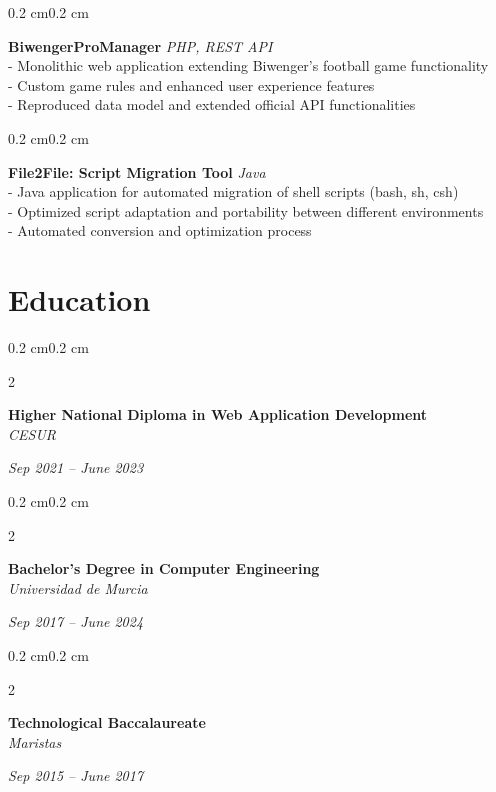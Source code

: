 \documentclass[10pt, letterpaper]{article}
\newenvironment{onecolentry}{
    \begin{adjustwidth}{0.2 cm}{0.2 cm}
}{
    \end{adjustwidth}
}
\newenvironment{twocolentry}[2][]{
    \onecolentry
    \def\secondColumn{#2}
    \setcolumnwidth{\fill, 4.5 cm}
    \begin{paracol}{2}
}{
    \switchcolumn \raggedleft \secondColumn
    \end{paracol}
    \endonecolentry
}
\begin{document}
    \vspace{0.1 cm}
    
    \begin{onecolentry}
        \textbf{BiwengerProManager} \hfill \textit{PHP, REST API} \\
        - Monolithic web application extending Biwenger's football game functionality \\
        - Custom game rules and enhanced user experience features \\
        - Reproduced data model and extended official API functionalities
    \end{onecolentry}

    \vspace{0.1 cm}
    
    \begin{onecolentry}
        \textbf{File2File: Script Migration Tool} \hfill \textit{Java} \\
        - Java application for automated migration of shell scripts (bash, sh, csh) \\
        - Optimized script adaptation and portability between different environments \\
        - Automated conversion and optimization process
    \end{onecolentry}

    \section{Education}
    \begin{twocolentry}{\textit{Sep 2021 -- June 2023}}
        \textbf{Higher National Diploma in Web Application Development} \\
        \textit{CESUR}
    \end{twocolentry}
    
    \begin{twocolentry}{\textit{Sep 2017 -- June 2024}}
        \textbf{Bachelor's Degree in Computer Engineering} \\
        \textit{Universidad de Murcia}
    \end{twocolentry}
    
    \begin{twocolentry}{\textit{Sep 2015 -- June 2017}}
        \textbf{Technological Baccalaureate} \\
        \textit{Maristas}
    \end{twocolentry}

\end{document}
